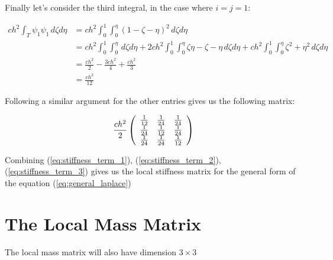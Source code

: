 Finally let's consider the third integral, in the case where $i = j = 1$:

\begin{align*}
       ch^2\int_T{\psi_1\psi_1}\,d\zeta d\eta
       &= ch^2\int_0^1\int_0^\eta{(1 - \zeta - \eta)^2}\, d\zeta d\eta \\
%
       &= ch^2\int_0^1\int_0^\eta\, d\zeta d\eta +
          2ch^2\int_0^1\int_0^\eta{\zeta\eta - \zeta - \eta}\, d\zeta d\eta +
          ch^2\int_0^1\int_0^\eta{\zeta^2 + \eta^2}\, d\zeta d\eta \\
%
       &= \frac{ch^2}{2} - \frac{3ch^2}{4} + \frac{ch^2}{3} \\
       &= \frac{ch^2}{12}
\end{align*}

Following a similar argument for the other entries gives us the following
matrix:

\begin{equation}\label{eq:stiffness_term_3}
    \frac{ch^2}{2}\left(\begin{array}{c c c}
         \frac{1}{12} &  \frac{1}{24} &  \frac{1}{24} \\
         \frac{1}{24} &  \frac{1}{12} &  \frac{1}{24} \\
         \frac{1}{24} &  \frac{1}{24} &  \frac{1}{12}
    \end{array}\right)
\end{equation}

Combining (\ref{eq:stiffness_term_1}), (\ref{eq:stiffness_term_2}),
(\ref{eq:stiffness_term_3}) gives us the local stiffness matrix for the general
form of the equation (\ref{eq:general_laplace})

\section{The Local Mass Matrix}

The local mass matrix will also have dimension $3 \times 3$
